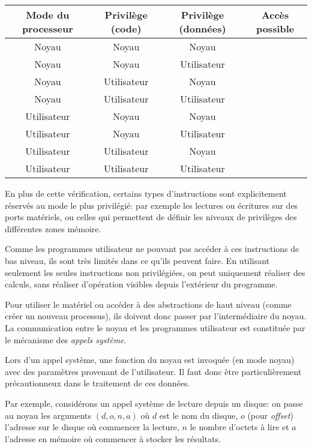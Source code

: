 \begin{center}
\def\modeK{Noyau\xspace}
\def\modeU{Utilisateur\xspace}
\begin{tabular}{cccc}
\toprule
  Mode du processeur
& Privilège (code)
& Privilège (données)
& Accès possible \\
\midrule
  \modeK{} & \modeK{} & \modeK{} & \CheckedBox{} \\
  \modeK{} & \modeK{} & \modeU{} & \CheckedBox{} \\
  \modeK{} & \modeU{} & \modeK{} & \CheckedBox{} \\
  \modeK{} & \modeU{} & \modeU{} & \CheckedBox{} \\
  \modeU{} & \modeK{} & \modeK{} & \Square{} \\
  \modeU{} & \modeK{} & \modeU{} & \Square{} \\
  \modeU{} & \modeU{} & \modeK{} & \Square{} \\
  \modeU{} & \modeU{} & \modeU{} & \CheckedBox{} \\
\bottomrule
\end{tabular}
\end{center}
\label{page:erreursec}

En plus de cette vérification, certains types d'instructions sont explicitement
réservés au mode le plus privilégié: par exemple les lectures ou écritures sur
des ports matériels, ou celles qui permettent de définir les niveaux de
privilèges des différentes zones mémoire.

Comme les programmes utilisateur ne pouvant pas accéder à ces instructions de
bas niveau, ils sont très limités dans ce qu'ils peuvent faire. En utilisant
seulement les seules instructions non privilégiées, on peut uniquement réaliser
des calculs, sans réaliser d'opération visibles depuis l'extérieur du programme.

Pour utiliser le matériel ou accéder à des abstractions de haut niveau (comme
créer un nouveau processus), ils doivent donc passer par l'intermédiaire du
noyau. La communication entre le noyau et les programmes utilisateur est
constituée par le mécanisme des \emph{appels système}.

Lors d'un appel système, une fonction du noyau est invoquée (en mode noyau) avec
des paramètres provenant de l'utilisateur. Il faut donc être particulièrement
précautionneux dans le traitement de ces données.

Par exemple, considérons un appel système de lecture depuis un disque: on passe
au noyau les arguments $(d, o, n, a)$ où $d$ est le nom du disque, $o$ (pour
\emph{offset}) l'adresse sur le disque où commencer la lecture, $n$ le nombre
d'octets à lire et $a$ l'adresse en mémoire où commencer à stocker les
résultats.

